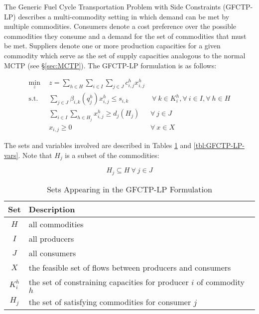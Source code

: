 
The Generic Fuel Cycle Transportation Problem with Side Constraints (GFCTP-LP)
describes a multi-commodity setting in which demand can be met by multiple
commodities. Consumers denote a cost preference over the possible commodities
they consume and a demand for the set of commodities that must be met. Suppliers
denote one or more production capacities for a given commodity which serve as
the set of supply capacities analogous to the normal MCTP
(see \S\ref{sec:MCTP}). The GFCTP-LP formulation is as follows:

\begin{subequations}\label{eqs:GFCTP-LP}
  \begin{align}
    \min_{z} \:\: & 
    z = \sum_{h \in H}\sum_{i \in I}\sum_{j \in J}c_{i,j}^{h} x_{i,j}^{h} 
    & \label{eqs:GFCTP-LP_obj} \\
    \text{s.t.} \:\: &
    \sum_{j \in J}\beta_{i,k}(q_{j}^{h}) x_{i,j}^{h} \leq s_{i,k} 
    &
    \: \forall \: k \in K_{i}^{h},  
    \forall \: i \in I, \forall \: h \in H \label{eqs:GFCTP-LP_sup} \\
    &
    \sum_{i \in I}\sum_{h \in H_{j}} x_{i,j}^{h} \geq d_{j}(H_{j}) 
    & 
    \forall \: j \in J \label{eqs:GFCTP-LP_dem} \\
    &
    x_{i,j} \geq 0
    &
    \forall \: x \in X \label{eqs:GFCTP-LP_x}
  \end{align}
\end{subequations}

The sets and variables involved are described in Tables \ref{tbl:GFCTP-LP-sets}
and \ref{tbl:GFCTP-LP-vars}. Note that $H_{j}$ is a subset of the commodities:

\begin{equation}
  H_{j} \subseteq H \: \forall \: j \in J
\end{equation}

\begin{table} [h!]
\centering
\begin{tabularx}{\textwidth-20pt}{|c|X|} %
\hline
Set         & Description \\
\hline
$H$         & all commodities  \\
$I$         & all producers  \\
$J$         & all consumers  \\
$X$         & the feasible set of flows between producers and consumers  \\
$K_{i}^{h}$  & the set of constraining capacities for 
            producer $i$ of commodity $h$  \\
$H_{j}$     & the set of satisfying commodities for consumer $j$  \\
\hline
\end{tabularx}
\caption{Sets Appearing in the GFCTP-LP Formulation}
\label{tbl:GFCTP-LP-sets}
\end{table}

